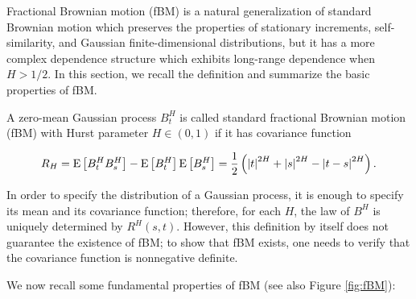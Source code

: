 \documentclass[11pt]{article}
\newcommand{\expt}[1]{\mathrm{E}\left[#1\right]}
\begin{document}
Fractional Brownian motion (fBM) is a natural generalization of standard Brownian motion which preserves the properties of stationary increments, self-similarity, and Gaussian finite-dimensional distributions, but it has a more complex dependence structure which exhibits long-range dependence when $H>1/2$. In this section, we recall the definition and summarize the basic properties of fBM.

A zero-mean Gaussian process $B^H_t$ is called standard fractional Brownian motion (fBM) with Hurst parameter $H \in(0,1)$ if it has covariance function

\begin{align}\label{eq:fbm_cov}
R_H=\expt{B_t^H B_s^H}-\expt{B_t^H}\expt{B_s^H}=\frac{1}{2} \left(\abs{t}^{2H}+\abs{s}^{2H}-\abs{t-s}^{2H}\right).	
\end{align}



In order to specify the distribution of a Gaussian process, it is enough to specify its mean and its covariance function; therefore, for each $H$, the law of $B^H$ is uniquely determined by $R^H(s, t)$. However, this definition by itself does not guarantee the existence of fBM; to show that fBM exists, one needs to verify that the covariance function is nonnegative definite.

We now recall some fundamental properties of fBM (see also Figure \ref{fig:fBM}):
\end{document}
